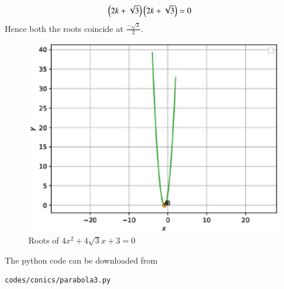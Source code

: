 \begin{enumerate}[label=\thesection.\arabic*.,ref=\thesection.\theenumi]
\begin{enumerate}
\begin{align}
\left(2k+\sqrt{3}\right)\left(2k+\sqrt{3}\right)&=0
\end{align}
Hence both the roots coincide at $\frac{-\sqrt{3}}{2}$.
\begin{figure}[!ht]
\centering
\includegraphics[width= \columnwidth]{./figs/conics/parabola3.eps}
\caption{Roots of $4x^2 + 4\sqrt{3}x + 3 = 0$}
\end{figure}
The python code can be downloaded from
\begin{lstlisting}
codes/conics/parabola3.py
\end{lstlisting}


\end{enumerate}
\end{enumerate}
